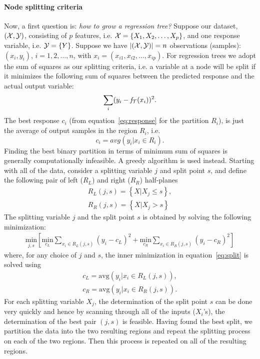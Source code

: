\textcolor[rgb]{0,0,1}{
\paragraph{\textbf{Node splitting criteria}}
Now, a first question is: \emph{how to grow a regression tree?}
Suppose our dataset, $(\mathcal{X},\mathcal{Y})$, consisting of $p$ features, i.e. $\mathcal{X} = \{X_1,X_2,\ldots,X_p\}$, and one response variable, i.e. $\mathcal{Y} = \{Y\}$. Suppose we have $|(\mathcal{X},\mathcal{Y})| = n$ observations (samples): $(x_i,y_i)$, $i=1,2,\ldots,n$, with $x_i=(x_{i1},x_{i2},\ldots,x_{ip})$.
For regression trees we adopt the sum of squares as our splitting criteria, i.e. a variable at a node will be split if it minimizes the following sum of squares between the predicted response and the actual output variable:
\begin{equation}
\sum_i (y_i - \mathit{f}_{\mathcal{T}}(x_i))^2.
\end{equation}
The best response $c_i$ (from equation~\ref{eq:response} for the partition $R_i$), is just the average of output samples in the region $R_i$, i.e.
\begin{equation}
c_i = avg(y_i|x_i \in R_i).
\label{eq:average}
\end{equation}
Finding the best binary partition in terms of minimum sum of squares is generally computationally infeasible. 
A greedy algorithm is used instead. Starting with all of the data, consider a splitting variable $j$ and split point $s$, and define the following pair of left ($R_L$) and right ($R_R$) half-planes
\begin{equation}
\begin{aligned}
R_L(j,s) = \left\lbrace X|X_j \leq s \right\rbrace ,\\
R_R(j,s) = \left\lbrace X|X_j > s \right\rbrace
\end{aligned}
\end{equation}
The splitting variable $j$ and the split point $s$ is obtained by solving the following minimization:
\begin{equation}
\begin{aligned}
\underset{j,s}{\text{min}}\left[\underset{c_L}{\text{min}} \sum_{x_i\in R_L(j,s)} (y_i - c_L)^2 + \underset{c_R}{\text{min}} \sum_{x_i\in R_R(j,s)} (y_i - c_R)^2 \right]  
\end{aligned}
\label{eq:split}
\end{equation}
where, for any choice of $j$ and $s$, the inner minimization in equation~\ref{eq:split} is solved using
\begin{equation}
\begin{aligned}
c_L = \text{avg}(y_i|x_i \in R_L(j,s)),\\
c_R = \text{avg}(y_i|x_i \in R_R(j,s)).
\end{aligned}
\end{equation}
For each splitting variable $X_j$, the determination of the split point $s$ can be done very quickly and hence by scanning through all of the inputs ($X_i$'s), the determination of the best pair $(j, s)$ is feasible.
Having found the best split, we partition the data into the two resulting regions and repeat the splitting process on each of the two regions. Then this process is repeated on all of the resulting regions.}

